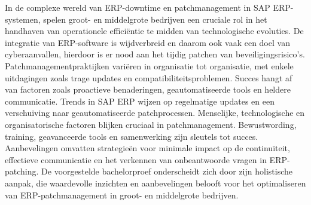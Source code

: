 In de complexe wereld van ERP-downtime en patchmanagement in SAP ERP-systemen, spelen groot- en middelgrote bedrijven een cruciale rol in het handhaven van operationele efficiëntie te midden van technologische evoluties. De integratie van ERP-software is wijdverbreid en daarom ook vaak een doel van cyberaanvallen, hierdoor is er nood aan het tijdig patchen van beveiligingsrisico’s. 
Patchmanagementpraktijken variëren in organisatie tot organisatie, met enkele uitdagingen zoals trage updates en compatibiliteitsproblemen. Succes hangt af van factoren zoals proactieve benaderingen, geautomatiseerde tools en heldere communicatie.
Trends in SAP ERP wijzen op regelmatige updates en een verschuiving naar geautomatiseerde patchprocessen. Menselijke, technologische en organisatorische factoren blijken cruciaal in patchmanagement. Bewustwording, training, geavanceerde tools en samenwerking zijn sleutels tot succes. Aanbevelingen omvatten strategieën voor minimale impact op de continuïteit, effectieve communicatie en het verkennen van onbeantwoorde vragen in ERP-patching.
De voorgestelde bachelorproef onderscheidt zich door zijn holistische aanpak, die waardevolle inzichten en aanbevelingen belooft voor het optimaliseren van ERP-patchmanagement in groot- en middelgrote bedrijven.
